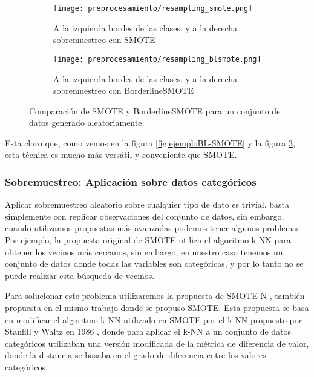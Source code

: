 \begin{figure}[H]
    \centering
	 \begin{subfigure}[b]{\textwidth}
		 \centering
		 \texttt{[image: preprocesamiento/resampling\_smote.png]}
		 \caption{A la izquierda bordes de las clases, y a la derecha sobremuestreo con SMOTE}
		 \label{fig:SMOTE-cmp}
	 \end{subfigure}

    \begin{subfigure}[b]{\textwidth}
		 \centering
		  \texttt{[image: preprocesamiento/resampling\_blsmote.png]}
        \caption{A la izquierda bordes de las clases, y a la derecha sobremuestreo con BorderlineSMOTE}
        \label{fig:BLSMOTE-cmp}
    \end{subfigure}

    \caption{Comparación de SMOTE y BorderlineSMOTE para un conjunto de datos generado aleatoriamente.}\label{fig:BLSMOTE-SMOTE}

\end{figure}

Esta claro que, como vemos en la figura \ref{fig:ejemploBL-SMOTE} y la figura \ref{fig:BLSMOTE-SMOTE}, esta técnica es mucho más versátil y conveniente que SMOTE.

\subsubsection{Sobremuestreo: Aplicación sobre datos categóricos}


Aplicar sobremuestreo aleatorio sobre cualquier tipo de dato es trivial, basta simplemente con replicar observaciones del conjunto de datos, sin embargo, cuando utilizamos propuestas más avanzadas podemos tener algunos problemas. Por ejemplo, la propuesta original de SMOTE utiliza el algoritmo k-NN para obtener los vecinos más cercanos, sin embargo, en nuestro caso tenemos un conjunto de datos donde todas las variables son categóricas, y por lo tanto no se puede realizar esta búsqueda de vecinos.

Para solucionar este problema utilizaremos la propuesta de SMOTE-N \cite{SMOTE}, también propuesta en el mismo trabajo donde se propuso SMOTE. Esta propuesta se basa en modificar el algoritmo k-NN utilizado en SMOTE por el k-NN propuesto por Stanfill y Waltz en 1986 \cite{kNNSMOTEN}, donde para aplicar el k-NN a un conjunto de datos categóricos utilizaban una versión modificada de la métrica de diferencia de valor, donde la distancia se basaba en el grado de diferencia entre los valores categóricos.

